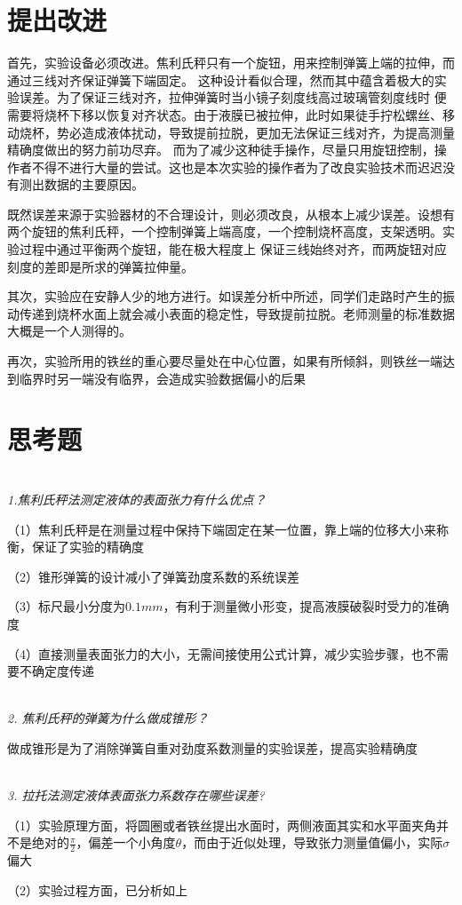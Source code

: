 \documentclass[UTF8]{ctexart}
\begin{document}
    
    \section{提出改进}
    首先，实验设备必须改进。焦利氏秤只有一个旋钮，用来控制弹簧上端的拉伸，而通过三线对齐保证弹簧下端固定。
    这种设计看似合理，然而其中蕴含着极大的实验误差。为了保证三线对齐，拉伸弹簧时当小镜子刻度线高过玻璃管刻度线时
    便需要将烧杯下移以恢复对齐状态。由于液膜已被拉伸，此时如果徒手拧松螺丝、移动烧杯，势必造成液体扰动，导致提前拉脱，更加无法保证三线对齐，为提高测量精确度做出的努力前功尽弃。
    而为了减少这种徒手操作，尽量只用旋钮控制，操作者不得不进行大量的尝试。这也是本次实验的操作者为了改良实验技术而迟迟没有测出数据的主要原因。

    既然误差来源于实验器材的不合理设计，则必须改良，从根本上减少误差。设想有两个旋钮的焦利氏秤，一个控制弹簧上端高度，一个控制烧杯高度，支架透明。实验过程中通过平衡两个旋钮，能在极大程度上
    保证三线始终对齐，而两旋钮对应刻度的差即是所求的弹簧拉伸量。

    其次，实验应在安静人少的地方进行。如误差分析中所述，同学们走路时产生的振动传递到烧杯水面上就会减小表面的稳定性，导致提前拉脱。老师测量的标准数据大概是一个人测得的。

    再次，实验所用的铁丝的重心要尽量处在中心位置，如果有所倾斜，则铁丝一端达到临界时另一端没有临界，会造成实验数据偏小的后果

    \section{思考题}
    
    \emph{\\[0.02cm]1.焦利氏秤法测定液体的表面张力有什么优点？}

    （1）焦利氏秤是在测量过程中保持下端固定在某一位置，靠上端的位移大小来称衡，保证了实验的精确度

    （2）锥形弹簧的设计减小了弹簧劲度系数的系统误差

    （3）标尺最小分度为$0.1mm$，有利于测量微小形变，提高液膜破裂时受力的准确度

    （4）直接测量表面张力的大小，无需间接使用公式计算，减少实验步骤，也不需要不确定度传递

    \emph{\\[0.2cm]2. 焦利氏秤的弹簧为什么做成锥形？}

    做成锥形是为了消除弹簧自重对劲度系数测量的实验误差，提高实验精确度

    \emph{\\[0.2cm]3. 拉托法测定液体表面张力系数存在哪些误差?}

    （1）实验原理方面，将圆圈或者铁丝提出水面时，两侧液面其实和水平面夹角并不是绝对的$\frac{\pi}{2}$，偏差一个小角度$\theta $，而由于近似处理，导致张力测量值偏小，实际$\sigma $偏大

    （2）实验过程方面，已分析如上


    \nocite{shiyanjiaocheng}
    \nocite{daolun}
    
\end{document}
